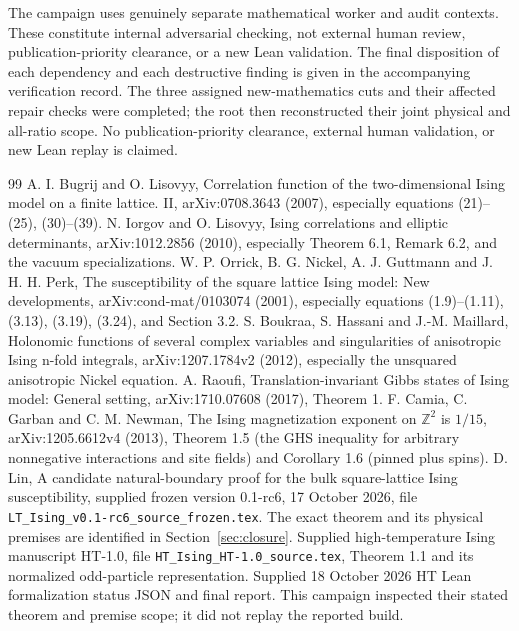 \documentclass[11pt]{article}
\numberwithin{equation}{section}
\theoremstyle{definition}
\begin{document}
The campaign uses genuinely separate mathematical worker and audit
contexts. These constitute internal adversarial checking, not external
human review, publication-priority clearance, or a new Lean validation.
The final disposition of each dependency and each destructive finding
is given in the accompanying verification record. The three assigned
new-mathematics cuts and their affected repair checks were completed;
the root then reconstructed their joint physical and all-ratio scope.
No publication-priority clearance, external human validation, or new
Lean replay is claimed.


\begin{thebibliography}{99}
 A. I. Bugrij and O. Lisovyy, Correlation function of the two-dimensional
Ising model on a finite lattice. II, arXiv:0708.3643 (2007), especially
equations (21)--(25), (30)--(39).
 N. Iorgov and O. Lisovyy, Ising correlations and elliptic determinants,
arXiv:1012.2856 (2010), especially Theorem 6.1, Remark 6.2,
and the vacuum specializations.
 W. P. Orrick, B. G. Nickel, A. J. Guttmann and J. H. H. Perk,
The susceptibility of the square lattice Ising model: New developments,
arXiv:cond-mat/0103074 (2001), especially equations (1.9)--(1.11),
(3.13), (3.19), (3.24), and Section 3.2.
 S. Boukraa, S. Hassani and J.-M. Maillard,
Holonomic functions of several complex variables and singularities of
anisotropic Ising n-fold integrals, arXiv:1207.1784v2 (2012),
especially the unsquared anisotropic Nickel equation.
 A. Raoufi, Translation-invariant Gibbs states of Ising model:
General setting, arXiv:1710.07608 (2017), Theorem 1.
 F. Camia, C. Garban and C. M. Newman, The Ising magnetization
exponent on $\mathbb Z^2$ is $1/15$, arXiv:1205.6612v4 (2013),
Theorem 1.5 (the GHS inequality for arbitrary nonnegative interactions
and site fields) and Corollary 1.6 (pinned plus spins).
 D. Lin, A candidate natural-boundary proof for the bulk
square-lattice Ising susceptibility, supplied frozen version 0.1-rc6,
17 October 2026, file \texttt{LT\_Ising\_v0.1-rc6\_source\_frozen.tex}.
The exact theorem and its physical premises are identified in Section~\ref{sec:closure}.
 Supplied high-temperature Ising manuscript HT-1.0,
file \texttt{HT\_Ising\_HT-1.0\_source.tex}, Theorem 1.1 and its normalized
odd-particle representation.
 Supplied 18 October 2026 HT Lean formalization status JSON
and final report. This campaign inspected their stated theorem and premise
scope; it did not replay the reported build.
\end{thebibliography}
\end{document}
